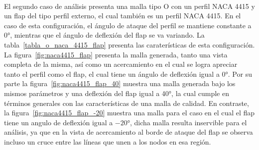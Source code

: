 \documentclass[letterpaper, openright, 12pt]{book}
\begin{document}
    \paragraph*{}
        El segundo caso de análisis presenta una malla tipo O con un perfil
        NACA 4415 y un flap del tipo perfil externo, el cual también es un
        perfil NACA 4415. En el caso de esta configuración, el ángulo de ataque
        del perfil se mantiene constante a 0\si{\degree}, mientras que el ángulo
        de deflexión del flap se va variando. La tabla~\ref{tabla_o_naca_4415_flap}
        presenta las  caraterísticas de esta configuración. La
        figura~\ref{fig:naca4415_flap} presenta la malla generada, tanto una
        vista completa de la misma, así como un acercamiento en el cual se logra
        apreciar tanto el perfil como el flap, el cual tiene un ángulo de
        deflexión igual a 0\si{\degree}. Por su parte la
        figura~\ref{fig:naca4415_flap_40} muestra una malla generada bajo los
        mismos parámetros y una deflexión del flap igual a 40\si{\degree}, la
        cual cumple en términos generales con las características de una malla
        de calidad. En contraste, la figura~\ref{fig:naca4415_flap_-20} muestra
        una malla para el caso en el cual el flap tiene un angulo de deflexión
        igual a $-20\si{\degree}$, dicha malla resulta inservible para el
        análisis, ya que en la vista de acercamiento al borde de ataque del flap
        se observa incluso un cruce entre las líneas que unen a los nodos en esa
        región.
\end{document}
